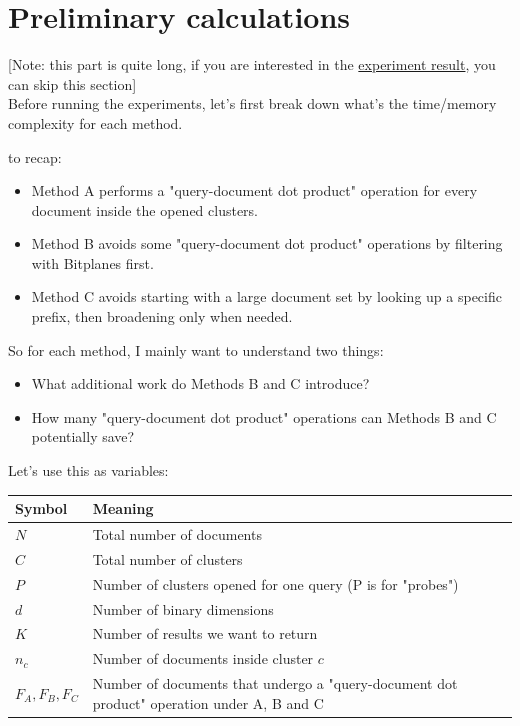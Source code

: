 \section{Preliminary calculations}
[Note: this part is quite long, if you are interested in the \hyperref[sec:experiments]{experiment result}, you can skip this section] \\

Before running the experiments, let’s first break down what's the time/memory complexity for each method.

to recap:
\begin{itemize}
  \item Method A performs a "query-document dot product" operation for every document inside the opened clusters.
  \item Method B avoids some "query-document dot product" operations by filtering with Bitplanes first.
  \item Method C avoids starting with a large document set by looking up a specific prefix, then broadening only when needed.
\end{itemize}

So for each method, I mainly want to understand two things:

\begin{itemize}
  \item What additional work do Methods B and C introduce?
  \item How many "query-document dot product" operations can Methods B and C potentially save?
\end{itemize}

Let's use this as variables:

\begin{center}
\begin{minipage}{\linewidth}
\small
\renewcommand{\arraystretch}{1.2}
\begin{tabular}{@{}p{.26\linewidth}p{.68\linewidth}@{}}
\toprule
Symbol & Meaning\\
\midrule
\(N\) & Total number of documents\\
\(C\) & Total number of clusters\\
\(P\) & Number of clusters opened for one query (P is for "probes")\\
\(d\) & Number of binary dimensions\\
\(K\) & Number of results we want to return\\
\(n_c\) & Number of documents inside cluster \(c\)\\
\(F_A,F_B,F_C\) & Number of documents that undergo a "query-document dot product" operation under A, B and C\\
\bottomrule
\end{tabular}
\end{minipage}
\end{center}


